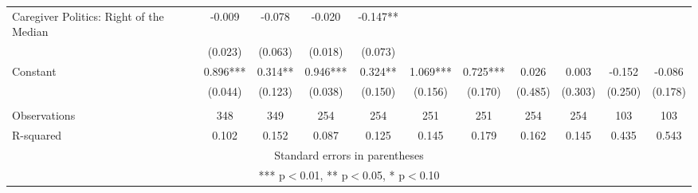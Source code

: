 \begin{tabular}{lcccccccccc}
Caregiver Politics: Right of the Median & -0.009 & -0.078 & -0.020 & -0.147** &  &  &  &  &  &  \\
 & (0.023) & (0.063) & (0.018) & (0.073) &  &  &  &  &  &  \\
Constant & 0.896*** & 0.314** & 0.946*** & 0.324** & 1.069*** & 0.725*** & 0.026 & 0.003 & -0.152 & -0.086 \\
 & (0.044) & (0.123) & (0.038) & (0.150) & (0.156) & (0.170) & (0.485) & (0.303) & (0.250) & (0.178) \\
 &  &  &  &  &  &  &  &  &  &  \\
Observations & 348 & 349 & 254 & 254 & 251 & 251 & 254 & 254 & 103 & 103 \\
 R-squared & 0.102 & 0.152 & 0.087 & 0.125 & 0.145 & 0.179 & 0.162 & 0.145 & 0.435 & 0.543 \\ \hline
\multicolumn{11}{c}{ Standard errors in parentheses} \\
\multicolumn{11}{c}{ *** p$<$0.01, ** p$<$0.05, * p$<$0.10} \\
\end{tabular}
